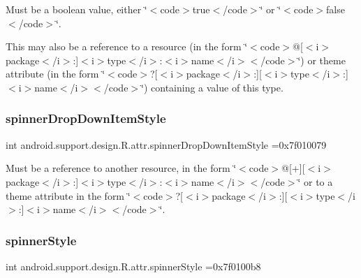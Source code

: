 Must be a boolean value, either \char`\"{}$<$code$>$true$<$/code$>$\char`\"{} or \char`\"{}$<$code$>$false$<$/code$>$\char`\"{}. 

This may also be a reference to a resource (in the form \char`\"{}$<$code$>$@\mbox{[}$<$i$>$package$<$/i$>$\+:\mbox{]}$<$i$>$type$<$/i$>$\+:$<$i$>$name$<$/i$>$$<$/code$>$\char`\"{}) or theme attribute (in the form \char`\"{}$<$code$>$?\mbox{[}$<$i$>$package$<$/i$>$\+:\mbox{]}\mbox{[}$<$i$>$type$<$/i$>$\+:\mbox{]}$<$i$>$name$<$/i$>$$<$/code$>$\char`\"{}) containing a value of this type. \mbox{\label{classandroid_1_1support_1_1design_1_1R_1_1attr_afbb73b15113fa7eb3cad3845486711fb}} 
\subsubsection{\texorpdfstring{spinner\+Drop\+Down\+Item\+Style}{spinnerDropDownItemStyle}}
{\footnotesize\ttfamily int android.\+support.\+design.\+R.\+attr.\+spinner\+Drop\+Down\+Item\+Style =0x7f010079\hspace{0.3cm}{\ttfamily [static]}}

Must be a reference to another resource, in the form \char`\"{}$<$code$>$@\mbox{[}+\mbox{]}\mbox{[}$<$i$>$package$<$/i$>$\+:\mbox{]}$<$i$>$type$<$/i$>$\+:$<$i$>$name$<$/i$>$$<$/code$>$\char`\"{} or to a theme attribute in the form \char`\"{}$<$code$>$?\mbox{[}$<$i$>$package$<$/i$>$\+:\mbox{]}\mbox{[}$<$i$>$type$<$/i$>$\+:\mbox{]}$<$i$>$name$<$/i$>$$<$/code$>$\char`\"{}. \mbox{\label{classandroid_1_1support_1_1design_1_1R_1_1attr_a822fe744c71f5d8738ea30e75cf31f90}} 
\subsubsection{\texorpdfstring{spinner\+Style}{spinnerStyle}}
{\footnotesize\ttfamily int android.\+support.\+design.\+R.\+attr.\+spinner\+Style =0x7f0100b8\hspace{0.3cm}{\ttfamily [static]}}

